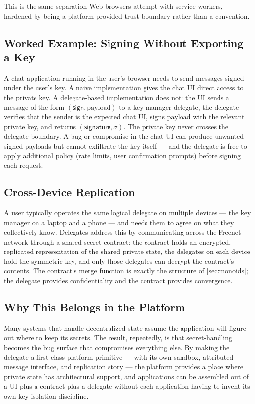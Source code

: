 This is the same separation Web browsers attempt with service workers, hardened by being a platform-provided trust boundary rather than a convention.

\subsection{Worked Example: Signing Without Exporting a Key}

A chat application running in the user's browser needs to send messages signed under the user's key. A naive implementation gives the chat UI direct access to the private key. A delegate-based implementation does not: the UI sends a message of the form $(\textsf{sign}, \mathrm{payload})$ to a key-manager delegate, the delegate verifies that the sender is the expected chat UI, signs $\mathrm{payload}$ with the relevant private key, and returns $(\textsf{signature}, \sigma)$. The private key never crosses the delegate boundary. A bug or compromise in the chat UI can produce unwanted signed payloads but cannot exfiltrate the key itself --- and the delegate is free to apply additional policy (rate limits, user confirmation prompts) before signing each request.

\subsection{Cross-Device Replication}

A user typically operates the same logical delegate on multiple devices --- the key manager on a laptop and a phone --- and needs them to agree on what they collectively know. Delegates address this by communicating across the Freenet network through a shared-secret contract: the contract holds an encrypted, replicated representation of the shared private state, the delegates on each device hold the symmetric key, and only those delegates can decrypt the contract's contents. The contract's merge function is exactly the structure of \cref{sec:monoids}; the delegate provides confidentiality and the contract provides convergence.

\subsection{Why This Belongs in the Platform}

Many systems that handle decentralized state assume the application will figure out where to keep its secrets. The result, repeatedly, is that secret-handling becomes the bug surface that compromises everything else. By making the delegate a first-class platform primitive --- with its own sandbox, attributed message interface, and replication story --- the platform provides a place where private state has architectural support, and applications can be assembled out of a UI plus a contract plus a delegate without each application having to invent its own key-isolation discipline.
